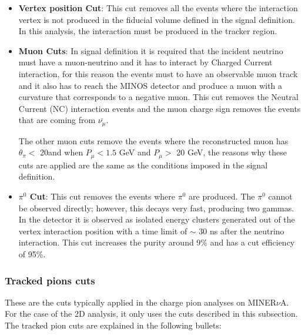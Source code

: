 \begin{itemize}
    \item \textbf{Vertex position Cut}: This cut removes all the events where the interaction vertex is not produced in the fiducial volume defined in the signal definition. In this analysis, the interaction must be produced in the tracker region. 
    \item \textbf{Muon Cuts}: In signal definition it is required that the incident neutrino must have a muon-neutrino and it has to interact by Charged Current interaction, for this reason the events must to have an observable muon track and it also has to reach the MINOS detector and produce a muon with a curvature that corresponds to a negative muon. This cut removes the Neutral Current (NC) interaction events and the muon charge sign removes the events that are coming from $\overline{\nu_\mu}$. 
    
    The other muon cuts remove the events where the reconstructed muon has $\theta_\pi<$ 20\textdegree  and when $P_\mu < 1.5$ GeV and $P_\mu>$ 20 GeV, the reasons why these cuts are applied are the same as the conditions imposed in the signal definition.  
    \item \textbf{$\pi^0$ Cut}: This cut removes the events where $\pi^0$ are produced. The $\pi^0$ cannot be observed directly; however, this decays very fast, producing two gammas. In the detector it is observed as isolated energy clusters generated out of the vertex interaction position with a time limit of \(\sim\) 30 ns after the neutrino interaction. This cut increases the purity around 9\% and has a cut efficiency of 95\%. 
\end{itemize}


\subsubsection{Tracked pions cuts}
\label{Cap:Analysis:DataSelection:Cuts:Tracked}

These are the cuts typically applied in the charge pion analyses on MINER$\nu$A. For the case of the 2D analysis, it only uses the cuts described in this subsection. The tracked pion cuts are explained in the following bullets:

